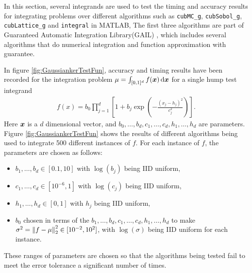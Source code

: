 \documentclass{iitthesis}
\theoremstyle{definition}
\begin{document}
\label{sec:cubmcgnumericalexample}

In this section, several integrands are used to test the timing and accuracy results for integrating problems over different algorithms such as {\tt cubMC\_g}, {\tt cubSobol\_g}, {\tt cubLattice\_g} and {\tt integral} in MATLAB, The first three algorithms are part of Guaranteed Automatic Integration Library(GAIL) \cite{GAIL_2_1}, which includes several algorithms that do numerical integration and function approximation with guarantee.


In figure \ref{fig:GaussiankerTestFun}, accuracy and timing results have been recorded for the integration problem 
$\mu=\int_{[0,1]^d} f(\vx) \, \dif \vx$ for a single hump test integrand
\begin{align}\label{GaussiankerTestFun}
f(x) = b_0\prod_{j=1}^d\left[ 1 +b_j \exp \left(-\frac{(x_j-h_j)^2}{c_j^2}\right) \right].
\end{align}
Here $\vx$ is a $d$ dimensional vector, and $ b_0, \ldots, b_d, c_1, \ldots, c_d, h_1, \ldots, h_d$ are parameters. Figure \ref{fig:GaussiankerTestFun} shows the results of different algorithms being used to integrate 500 different instances of $f$.  For each instance of $f$, the parameters are chosen as follows:
\begin{itemize} 
\item $b_1, \ldots, b_d \in [0.1,10]$ with $\log(b_j)$ being IID uniform,
\item $c_1, \ldots, c_d \in [10^{-6},1]$ with $\log(c_j)$ being IID uniform,
\item $h_1, \ldots, h_d \in [0,1]$ with $h_j$ being IID uniform,
\item $b_0$ chosen in terms of the $b_1, \ldots, b_d, c_1, \ldots, c_d, h_1, \ldots, h_d$ to make $\sigma^2 =\norm[2]{f-\mu}^2 \in [10^{-2}, 10^2]$, with $\log(\sigma)$ being IID uniform for each instance.
\end{itemize}
These ranges of parameters are chosen so that the algorithms being tested fail to meet the error tolerance a significant number of times.
\end{document}
